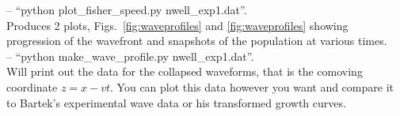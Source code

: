 \documentclass[a4paper,10pt]{article}
\begin{document}
-- ``python plot\_fisher\_speed.py nwell\_exp1.dat''.\\
Produces 2 plots, Figs.~\ref{fig:waveprofiles} and \ref{fig:waveprofiles} showing progression of the wavefront and snapshots of the population at various times.\\

-- ``python make\_wave\_profile.py nwell\_exp1.dat''.\\
Will print out the data for the collapsed waveforms, that is the comoving coordinate $z=x-vt$. You can plot this data however you want and compare it
to Bartek's experimental wave data or his transformed growth curves.\\



 
 \clearpage
 \newpage
\end{document}
